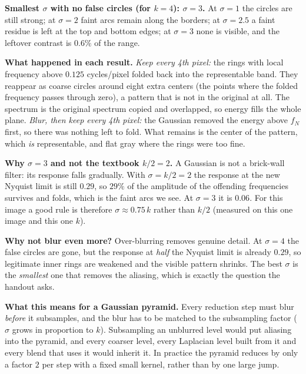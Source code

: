 \documentclass[11pt,a4paper]{article}
\begin{document}
\begin{answerbox}
\textbf{Smallest $\sigma$ with no false circles (for $k=4$): $\sigma=3$.}
At $\sigma=1$ the circles are still strong; at $\sigma=2$ faint arcs remain along the borders; at $\sigma=2.5$ a faint
residue is left at the top and bottom edges; at $\sigma=3$ none is visible, and the leftover contrast is $0.6\%$ of the range.

\textbf{What happened in each result.}
\emph{Keep every 4th pixel:} the rings with local frequency above $0.125$ cycles/pixel folded back into the representable
band. They reappear as coarse circles around eight extra centers (the points where the folded frequency passes through
zero), a pattern that is not in the original at all. The spectrum is the original spectrum copied and overlapped, so
energy fills the whole plane. \emph{Blur, then keep every 4th pixel:} the Gaussian removed the energy above $f_N$ first, so
there was nothing left to fold. What remains is the center of the pattern, which \emph{is} representable, and flat gray where the rings were too fine.
\end{answerbox}

\begin{whybox}
\textbf{Why $\sigma=3$ and not the textbook $k/2=2$.} A Gaussian is not a brick-wall filter: its response falls gradually.
With $\sigma=k/2=2$ the response at the new Nyquist limit is still $0.29$, so $29\%$ of the amplitude of the offending
frequencies survives and folds, which is the faint arcs we see. At $\sigma=3$ it is $0.06$. For this image a good rule is
therefore $\sigma\approx0.75\,k$ rather than $k/2$ (measured on this one image and this one $k$).

\textbf{Why not blur even more?} Over-blurring removes genuine detail. At $\sigma=4$ the false circles are gone, but the response at
\emph{half} the Nyquist limit is already $0.29$, so legitimate inner rings are weakened and the visible pattern shrinks.
The best $\sigma$ is the \emph{smallest} one that removes the aliasing, which is exactly the question the handout asks.
\end{whybox}

\begin{answerbox}
\textbf{What this means for a Gaussian pyramid.} Every reduction step must blur \emph{before} it subsamples, and the blur has to be
matched to the subsampling factor ($\sigma$ grows in proportion to $k$). Subsampling an unblurred level would put aliasing into the
pyramid, and every coarser level, every Laplacian level built from it and every blend that uses it would inherit it. In practice the
pyramid reduces by only a factor $2$ per step with a fixed small kernel, rather than by one large jump.
\end{answerbox}
\end{document}
